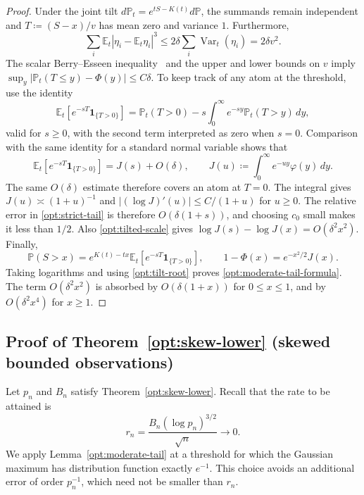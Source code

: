 \documentclass[11pt,letterpaper]{article}
\theoremstyle{remark}
\newcommand{\E}{\mathbb E}
\newcommand{\Pp}{\mathbb P}
\newcommand{\Var}{\operatorname{Var}}
\newcommand{\ind}{\mathbf 1}
\begin{document}
\begin{proof}
Under the joint tilt
\(d\Pp_t=e^{tS-K(t)}d\Pp\), the summands remain independent and
\(T\coloneqq(S-x)/v\) has mean zero and variance \(1\). Furthermore,
\[
 \sum_i\E_t|\eta_i-\E_t\eta_i|^3
 \le2\delta\sum_i\Var_t(\eta_i)=2\delta v^2.
\]
The scalar Berry--Esseen inequality~\cite{Berry1941} and the upper and lower bounds on \(v\) imply
\(\sup_y|\Pp_t(T\le y)-\Phi(y)|\le C\delta\).
To keep track of any atom at the threshold, use the identity
\[
 \E_t[e^{-sT}\ind_{\{T>0\}}]
 =\Pp_t(T>0)-s\int_0^\infty e^{-sy}\Pp_t(T>y)\,dy,
\]
valid for \(s\ge0\), with the second term interpreted as zero when
\(s=0\). Comparison with
the same identity for a standard normal variable shows that
\begin{equation}
 \E_t[e^{-sT}\ind_{\{T>0\}}]=J(s)+O(\delta),\qquad
 J(u)\coloneqq\int_0^\infty e^{-uy}\varphi(y)\,dy.
 \label{opt:strict-tail}
\end{equation}
The same \(O(\delta)\) estimate therefore covers an atom at \(T=0\).
The integral gives \(J(u)\asymp(1+u)^{-1}\) and
\(|(\log J)'(u)|\le C/(1+u)\) for \(u\ge0\).
The relative error in \eqref{opt:strict-tail} is therefore
\(O(\delta(1+s))\), and choosing \({c_0}\) small makes it less than \(1/2\).
Also \eqref{opt:tilted-scale} gives
\(\log J(s)-\log J(x)=O(\delta^2x^2)\).
Finally,
\[
 \Pp(S>x)=e^{K(t)-tx}\E_t[e^{-sT}\ind_{\{T>0\}}],\qquad
 1-\Phi(x)=e^{-x^2/2}J(x).
\]
Taking logarithms and using \eqref{opt:tilt-root} proves
\eqref{opt:moderate-tail-formula}. The term \(O(\delta^2x^2)\) is
absorbed by \(O(\delta(1+x))\) for \(0\le x\le1\), and by
\(O(\delta^2x^4)\) for \(x\ge1\).
\end{proof}


\subsection{Proof of Theorem~\ref*{opt:skew-lower} (skewed bounded observations)}

\label{app:skew-proof}
Let \(p_n\) and \(B_n\) satisfy Theorem~\ref{opt:skew-lower}.
Recall that the rate to be attained is
\[
 r_n=\frac{B_n(\log p_n)^{3/2}}{\sqrt n}\longrightarrow0.
\]
We apply Lemma~\ref{opt:moderate-tail} at a threshold for which the
Gaussian maximum has distribution function exactly \(e^{-1}\).
This choice avoids an additional error of order \(p_n^{-1}\),
which need not be smaller than \(r_n\).
\end{document}
